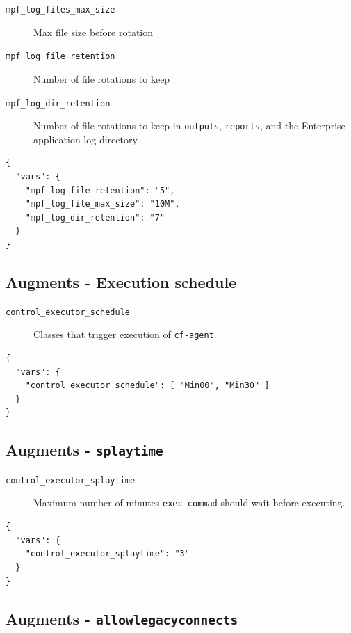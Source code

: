 \documentclass[11pt]{article}
\begin{document}
\begin{description}
\item[{\texttt{mpf\_log\_files\_max\_size}}] Max file size before rotation
\item[{\texttt{mpf\_log\_file\_retention}}] Number of file rotations to keep
\item[{\texttt{mpf\_log\_dir\_retention}}] Number of file rotations to keep in \texttt{outputs},
\texttt{reports}, and the Enterprise application log directory.
\end{description}

\begin{verbatim}
{
  "vars": {
    "mpf_log_file_retention": "5",
    "mpf_log_file_max_size": "10M",
    "mpf_log_dir_retention": "7"
  }
}
\end{verbatim}

\subsection*{Augments - Execution schedule}
\label{sec:org0f9b0ce}

\begin{description}
\item[{\texttt{control\_executor\_schedule}}] Classes that trigger execution of \texttt{cf-agent}.
\end{description}

\begin{verbatim}
{
  "vars": {
    "control_executor_schedule": [ "Min00", "Min30" ]
  }
}
\end{verbatim}

\subsection*{Augments - \texttt{splaytime}}
\label{sec:org77cb975}

\begin{description}
\item[{\texttt{control\_executor\_splaytime}}] Maximum number of minutes \texttt{exec\_commad} should
wait before executing.
\end{description}

\begin{verbatim}
{
  "vars": {
    "control_executor_splaytime": "3"
  }
}
\end{verbatim}

\subsection*{Augments - \texttt{allowlegacyconnects}}
\label{sec:orgd61e204}
\end{document}
